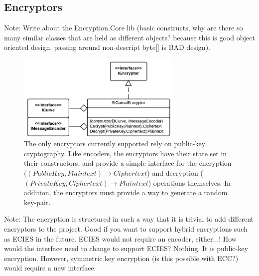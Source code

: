 \subsection{Encryptors}

Note: Write about the Encryption.Core lib (basic constructs, why are there so many similar classes that are held
as different objects? because this is good object oriented design. passing around non-descript byte[] is BAD design).

\begin{figure}[htb]
	\centering
	\includegraphics[width=0.7\textwidth]{implementation/encryptors}
	\caption{The only encryptors currently supported rely on public-key cryptography. Like encoders, the encryptors have their state set
		in their constructors, and provide a simple interface for the encryption (\((PublicKey,Plaintext) \to Ciphertext\)) and decryption
		(\((PrivateKey,Ciphertext) \to Plaintext\)) operations themselves. In addition, the encryptors must provide a way to generate a
		random key-pair.}
\end{figure}

Note: The encryption is structured in such a way that it is trivial to add different encryptors to the project. Good
if you want to support hybrid encryptions such as ECIES in the future. ECIES would not require an encoder, either...!
How would the interface need to change to support ECIES? Nothing. It is public-key encryption.
However, symmetric key encryption (is this possible with ECC?) would require a new interface.